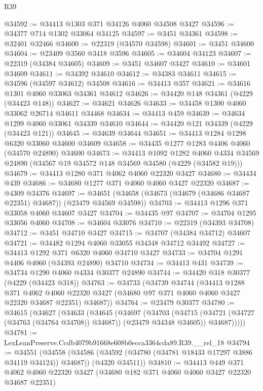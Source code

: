 \begin{lexlean}{R39}
\begin{coremodule}
@34592 := @34413 @1303 @371 @34126 @4060 @34508 @3427
@34596 := @34377 @714 @1302 @33064 @34125
@34597 := @3451 @34361
@34598 := @32401 @32466
@34600 := @22319 (@34570 @34598)
@34601 := @3451 @34600
@34604 := @23409 @3560 @3418 @3596
@34605 := @34604 @34123
@34607 := @22319 (@34384 @34605)
@34609 := @3451 @34607 @3427
@34610 := @34601 @34609
@34611 := @34392 @34610
@34612 := @34383 @34611
@34615 := @34596 (@34597 @34612) @34508
@34616 := @34413 @357
@34621 := @34616 @1301 @4060 @33063 @34361 @34612
@34626 := @34420 @148 @34361 (@4229 (@34423 @148))
@34627 := @34621 @34626
@34633 := @34458 @1300 @4060 @33062 @26714 @34611 @34468
@34634 := @34413 @459
@34639 := @34634 @1299 @4060 @33061 @34339 @34610
@34644 := @34420 @121 @34339 (@4229 (@34423 @121))
@34645 := @34639 @34644
@34651 := @34413 @1284 @1298 @6320 @33060 @34600 @34609
@34658 := @34435 @1277 @1283 @4406 @4060 (@34570 @24890) @34600
@34673 := @34413
    @1092
    @1282
    @4060
    @4334
    @34569
    @24890
    (@34567 @19 @34572 @148 @34569 @34580 (@4229 (@34582 @19)))
@34679 := @34413 @1280 @371 @4062 @4060 @22320 @3427
@34680 := @34434 @439
@34686 := @34680 @1277 @371 @4060 @4060 @3427 @22320
@34687 := @4309 @34376
@34697 := @34651 (@34658 (@34673 (@34679 (@34686 @34687 @22351) @34687)) (@23479 @34569 @34598))
@34703 := @34413 @1296 @371 @33058 @4060 @34607 @3427
@34704 := @34435 @97
@34707 := @34704 @1295 @33056 @4060
@34708 := @34604 @33076
@34710 := @22319 (@34393 @34708)
@34712 := @3451 @34710 @3427
@34715 := @34707 (@34384 @34712) @34607
@34721 := @34482 @1294 @4060 @33055 @34348 @34712 @34492
@34727 := @34413 @1292 @371 @6320 @4060 @34710 @3427
@34733 := @34704 @1291 @4406 @4060 (@34393 @24890) @34710
@34734 := @34413 @431
@34739 := @34734 @1290 @4060 @4334 @30377 @24890
@34744 := @34420 @318 @30377 (@4229 (@34423 @318))
@34763 := @34733
    (@34739
      @34744
      (@34413
        @1288
        @371
        @4062
        @4060
        @22320
        @3427
        (@34680 @97 @371 @4060 @4060 @3427 @22320 @34687 @22351)
        @34687))
@34764 := @23479 @30377
@34780 := @34615
    (@34627
      (@34633
        (@34645
          (@34697
            (@34703
              (@34715 (@34721 (@34727 (@34763 (@34764 @34708)) @34687)) (@23479 @34348 @34605))
              @34687)))))
@34781 := LexLeanPreserve.Ccdb4079b91668e608b0ecca3364cda89.R39.__rel_18
@34794 := @34551
    (@34558
      (@34586 (@34592 (@34780 (@34781 @18433 @17297 @3886 @34119 @34124)) @34687))
      (@4320 @34511))
@34810 := @34413
    @449
    @371
    @4062
    @4060
    @22320
    @3427
    (@34680 @182 @371 @4060 @4060 @3427 @22320 @34687 @22351)

\end{coremodule}
\end{lexlean}
